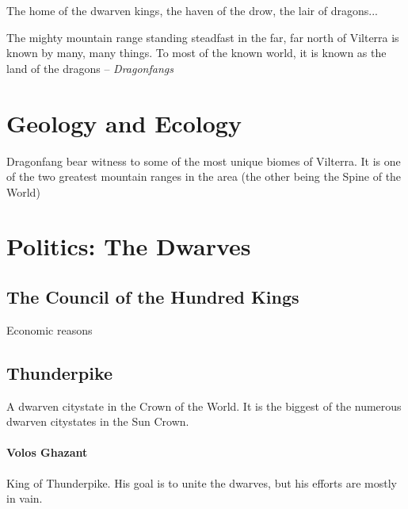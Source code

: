 \documentclass[../main.tex]{subfiles}
\begin{document}
The home of the dwarven kings, the haven of the drow,
the lair of dragons...

The mighty mountain range standing steadfast in the far,
far north of Vilterra is known by many, many things. To
most of the known world, it is known as the land of the
dragons -- \emph{Dragonfangs}

\section{Geology and Ecology}
Dragonfang bear witness to some of the most unique
biomes of Vilterra. It is one of the two greatest
mountain ranges in the area (the other being the Spine of
the World)

\section{Politics: The Dwarves}

\subsection{The Council of the Hundred Kings}
Economic reasons

\subsection{Thunderpike}
A dwarven citystate in the Crown of the World. It is the
biggest of the numerous dwarven citystates in the
Sun Crown.

\paragraph{Volos Ghazant}
King of Thunderpike. His goal is to unite the dwarves, but
his efforts are mostly in vain.
\end{document}
